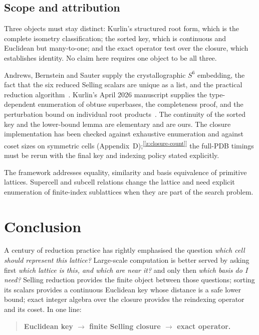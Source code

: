 \documentclass[11pt]{article}
\newcommand{\chk}[1]{\textsuperscript{[\ref{#1}]}}
\begin{document}
\subsection{Scope and attribution}

Three objects must stay distinct: Kurlin's structured root form, which is the complete isometry classification; the sorted key, which is continuous and Euclidean but many-to-one; and the exact operator test over the closure, which establishes identity. No claim here requires one object to be all three.

Andrews, Bernstein and Sauter supply the crystallographic $S^6$ embedding, the fact that the six reduced Selling scalars are unique as a list, and the practical reduction algorithm~\cite{ab1988,abs2019,ab2023}. Kurlin's April 2026 manuscript supplies the type-dependent enumeration of obtuse superbases, the completeness proof, and the perturbation bound on individual root products~\cite{kurlin2026}. The continuity of the sorted key and the lower-bound lemma are elementary and are ours. The closure implementation has been checked against exhaustive enumeration and against coset sizes on symmetric cells (Appendix~D);\chk{z:closure-count} the full-PDB timings must be rerun with the final key and indexing policy stated explicitly.

The framework addresses equality, similarity and basis equivalence of primitive lattices. Supercell and subcell relations change the lattice and need explicit enumeration of finite-index sublattices when they are part of the search problem.

\section{Conclusion}

A century of reduction practice has rightly emphasised the question \emph{which cell should represent this lattice?} Large-scale computation is better served by asking first \emph{which lattice is this, and which are near it?} and only then \emph{which basis do I need?} Selling reduction provides the finite object between those questions; sorting its scalars provides a continuous Euclidean key whose distance is a safe lower bound; exact integer algebra over the closure provides the reindexing operator and its coset. In one line:
\begin{quote}
\textbf{Euclidean key $\rightarrow$ finite Selling closure $\rightarrow$ exact operator.}
\end{quote}
\end{document}

